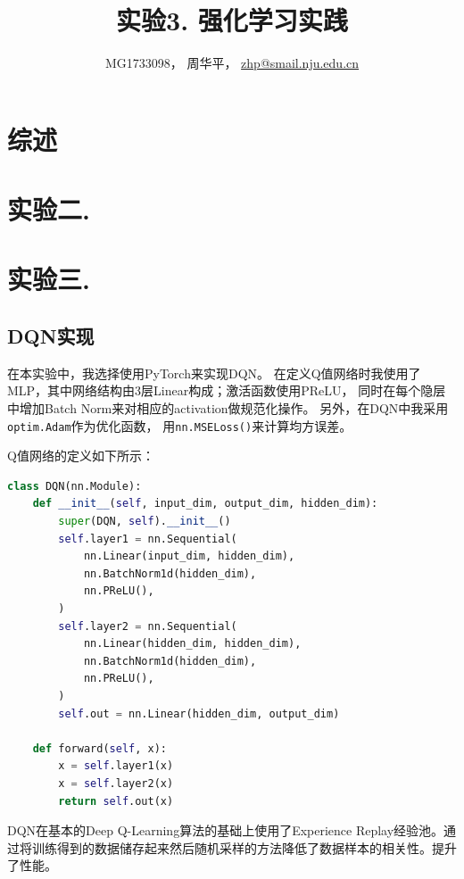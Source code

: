 \documentclass[a4paper,UTF8]{article}
\theoremstyle{definition}
\begin{document}
\title{实验3. 强化学习实践}
\author{MG1733098， 周华平， \url{zhp@smail.nju.edu.cn}}
\maketitle

\section*{综述}



\section*{实验二.}



\section*{实验三.}

\subsection*{DQN实现}

在本实验中，我选择使用PyTorch来实现DQN。
在定义Q值网络时我使用了MLP，其中网络结构由3层Linear构成；激活函数使用PReLU，
同时在每个隐层中增加Batch Norm来对相应的activation做规范化操作。
另外，在DQN中我采用\lstinline[language=Python]{optim.Adam}作为优化函数，
用\lstinline[language=Python]{nn.MSELoss()}来计算均方误差。

Q值网络的定义如下所示：

\begin{lstlisting}[language=Python]
class DQN(nn.Module):
    def __init__(self, input_dim, output_dim, hidden_dim):
        super(DQN, self).__init__()
        self.layer1 = nn.Sequential(
            nn.Linear(input_dim, hidden_dim),
            nn.BatchNorm1d(hidden_dim),
            nn.PReLU(),
        )
        self.layer2 = nn.Sequential(
            nn.Linear(hidden_dim, hidden_dim),
            nn.BatchNorm1d(hidden_dim),
            nn.PReLU(),
        )
        self.out = nn.Linear(hidden_dim, output_dim)

    def forward(self, x):
        x = self.layer1(x)
        x = self.layer2(x)
        return self.out(x)
\end{lstlisting}

DQN在基本的Deep Q-Learning算法的基础上使用了Experience Replay经验池。通过将训练得到的数据储存起来然后随机采样的方法降低了数据样本的相关性。提升了性能。
\end{document}
